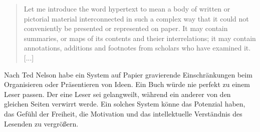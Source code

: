 \begin{quote}
	\glqq Let me introduce the word hypertext to mean a body of written or pictorial material interconnected in such a complex way that it could not conveniently be presented or represented on paper. It may contain summaries, or maps of its contents and theier interrelations; it may contain annotations, additions and footnotes from scholars who have examined it. [...]\grqq{ }\cite{Nelson1965}
\end{quote}

Nach Ted Nelson habe ein System auf Papier gravierende Einschränkungen beim Organisieren oder Präsentieren von Ideen. Ein Buch würde nie perfekt zu einem Leser passen. Der eine Leser sei gelangweilt, während ein anderer von den gleichen Seiten verwirrt werde. \glqq Ein solches System könne das Potenzial haben, das Gefühl der Freiheit, die Motivation und das intellektuelle Verständnis des Lesenden zu vergrößern\grqq{ }\cite{Nelson1965}. 

